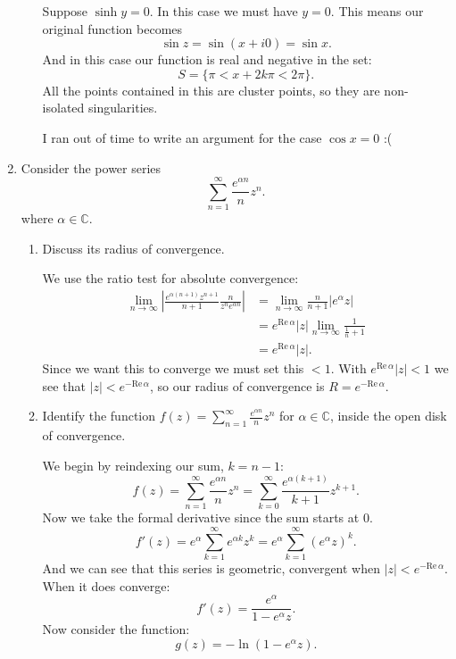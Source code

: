 \documentclass{article}
\begin{document}
\begin{enumerate}
\begin{enumerate}[label= (\alph*)]
            Suppose $\sinh y=0$. In this case we must have $y=0$.
            This means our original function becomes
            \[
            \sin z= \sin(x+i0)=\sin x
            .\] 
            And in this case our function is real and negative in the set:
            $$S=\{\pi<x+2k\pi<2\pi\}.$$
            All the points contained in this are cluster points, so they are non-isolated singularities.

            I ran out of time to write an argument for the case $\cos x=0$ :(
    \end{enumerate}
\item Consider the power series
    \[
    \sum_{n=1}^{\infty} \frac{e^{\alpha n}}{n} z^n
    .\] 
where $\alpha \in  \mathbb{C}$.
\begin{enumerate}[label= (\alph*)] 
    \item Discuss its radius of convergence.

        We use the ratio test for absolute convergence:
        \begin{align*}
            \lim_{n \to \infty} \left| \frac{e^{\alpha(n+1)}z^{n+1}}{n+1}\frac{n}{z^{n}e^{\alpha n}} \right| &= \lim_{n \to \infty} \frac{n}{n+1}\left| e^{\alpha}z \right|  \\
            &= e^{\mathrm{Re}\,\alpha}|z|\lim_{n \to \infty} \frac{1}{\frac{1}{n}+1} \\
            &= e^{\mathrm{Re}\,\alpha}|z|
        .\end{align*}
        Since we want this to converge we must set this $<1$. With $e^{\mathrm{Re}\,\alpha}|z|<1$ we 
        see that $|z|<e^{-\mathrm{Re}\,\alpha}$, so our radius of convergence is $R=e^{-\mathrm{Re}\,\alpha}$.

    \item Identify the function $f (z) = \sum_{n=1}^{\infty} \frac{e^{\alpha n}}{n} z^n$
    for $\alpha\in \mathbb{C}$, inside the open disk of convergence.

    We begin by reindexing our sum, $k=n-1$:
    \[
    f(z)=\sum_{n=1}^{\infty} \frac{e^{\alpha n}}{n}z^{n}=\sum_{k=0}^{\infty} \frac{e^{\alpha(k+1)}}{k+1}z^{k+1}
    .\] 
    Now we take the formal derivative since the sum starts at 0.
    \[
    f'(z)=e^{\alpha}\sum_{k=1}^{\infty} e^{\alpha k}z^{k}=e^{\alpha}\sum_{k=1}^{\infty} (e^{\alpha}z)^{k}
    .\] 
    And we can see that this series is geometric, convergent when $|z|<e^{-\mathrm{Re}\,\alpha}$.
    When it does converge:
    \[
    f'(z)=\frac{e^{\alpha }}{1-e^{\alpha}z}
    .\] 
    Now consider the function:
    \[
    g(z)=-\ln(1-e^{\alpha}z).\]


\end{enumerate}
\end{enumerate}
\end{document}
